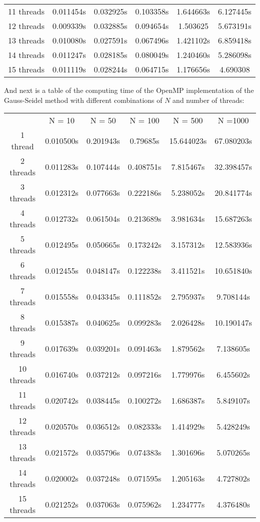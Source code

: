 \documentclass{article}
\begin{document}
\begin{enumerate}
\begin{enumerate}
\begin{center}
\begin{tabular}{ c c c c c c}
11 threads & 0.011454s & 0.032925s & 0.103358s & 1.644663s & 6.127445s \\
12 threads & 0.009339s & 0.032885s & 0.094654s & 1.503625 & 5.673191s  \\
13 threads & 0.010080s & 0.027591s & 0.067496s & 1.421102s & 6.859418s \\
14 threads & 0.011247s & 0.028185s & 0.080049s & 1.240460s & 5.286098s \\
15 threads &  0.011119s & 0.028244s & 0.064715s & 1.176656s & 4.690308 
\end{tabular}
\end{center}
And next is a table of the computing time of the OpenMP implementation of the Gauss-Seidel method with different combinations of $N$ and number of threads:
\begin{center}
\begin{tabular}{ c c c c c c}
 & N = 10  & N = 50  & N = 100 & N = 500  & N =1000 \\
1 thread & 0.010500s & 0.201943s & 0.79685s & 15.644023s  & 67.080203s\\
2 threads & 0.011283s & 0.107444s & 0.408751s & 7.815467s & 32.398457s \\
3 threads & 0.012312s & 0.077663s &  0.222186s & 5.238052s & 20.841774s \\
4 threads & 0.012732s & 0.061504s &  0.213689s & 3.981634s & 15.687263s \\
5 threads & 0.012495s & 0.050665s & 0.173242s &  3.157312s & 12.583936s \\
6 threads & 0.012455s & 0.048147s & 0.122238s & 3.411521s & 10.651840s \\
7 threads &  0.015558s & 0.043345s & 0.111852s & 2.795937s & 9.708144s \\
8 threads & 0.015387s & 0.040625s &  0.099283s & 2.026428s & 10.190147s \\
9 threads & 0.017639s &  0.039201s & 0.091463s & 1.879562s & 7.138605s \\
10 threads & 0.016740s & 0.037212s &0.097216s&1.779976s & 6.455602s \\
11 threads & 0.020742s & 0.038445s &  0.100272s &1.686387s & 5.849107s \\
12 threads & 0.020570s & 0.036512s & 0.082333s &1.414929s &5.428249s \\
13 threads & 0.021572s  & 0.035796s & 0.074383s & 1.301696s & 5.070265s\\
14 threads & 0.020002s & 0.037248s & 0.071595s & 1.205163s & 4.727802s \\
15 threads & 0.021252s &  0.037063s &0.075962s& 1.234777s & 4.376480s
\end{tabular}
\end{center}
\end{enumerate}
\end{enumerate}
\end{document}
